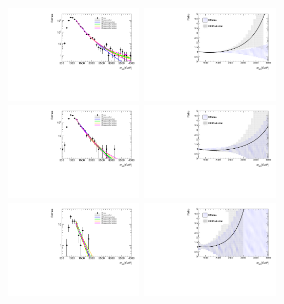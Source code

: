 \begin{figure}[htb!]
\begin{center}
\includegraphics[width=0.31\textwidth,angle=-90]{figures/boosted/Syst_Shape/QCDSysfitSmooth_22.pdf}
\includegraphics[width=0.31\textwidth,angle=-90]{figures/boosted/Syst_Shape/QCDSysfitSmooth_ratio_22.pdf} \\
\includegraphics[width=0.31\textwidth,angle=-90]{figures/boosted/Syst_Shape/QCDSysfitSmooth_33.pdf}
\includegraphics[width=0.31\textwidth,angle=-90]{figures/boosted/Syst_Shape/QCDSysfitSmooth_ratio_33.pdf} \\
\includegraphics[width=0.31\textwidth,angle=-90]{figures/boosted/Syst_Shape/QCDSysfitSmooth_44.pdf}
\includegraphics[width=0.31\textwidth,angle=-90]{figures/boosted/Syst_Shape/QCDSysfitSmooth_ratio_44.pdf} \\

\end{center}
\end{figure}
